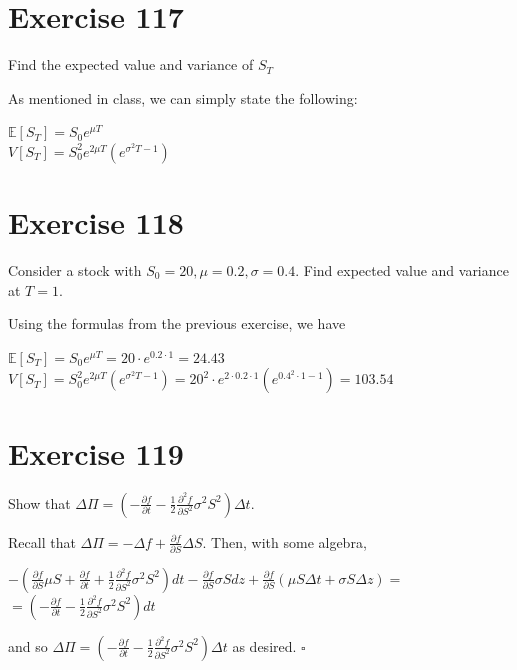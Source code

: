 \documentclass{article}
\begin{document}
\section*{Exercise 117}
Find the expected value and variance of $S_T$
\begin{flushleft}
    As mentioned in class, we can simply state the following:
    \begin{center}
        $\mathbb{E}[S_T] = S_0e^{\mu T}$ \\
        $V[S_T] = S_0^2 e^{2\mu T}(e^{\sigma^2T - 1})$
    \end{center}
\end{flushleft}

\section*{Exercise 118}
Consider a stock with $S_0 = 20, \mu = 0.2, \sigma = 0.4$. Find expected value and variance at $T=1$.
\begin{flushleft}
    Using the formulas from the previous exercise, we have
    \begin{center}
        $\mathbb{E}[S_T] = S_0e^{\mu T} = 20 \cdot e^{0.2 \cdot 1} = 24.43$ \\
        $V[S_T] = S_0^2 e^{2\mu T}(e^{\sigma^2T - 1}) = 20^2 \cdot e^{2 \cdot 0.2 \cdot 1}(e^{0.4^2 \cdot 1 - 1}) = 103.54$
    \end{center}
\end{flushleft}

\section*{Exercise 119}
Show that $\Delta \Pi = \left( -\frac{\partial f}{\partial t} - \frac{1}{2}\frac{\partial ^2 f}{\partial S^2} \sigma^2 S^2 \right) \Delta t$.
\begin{flushleft}
    Recall that $\Delta \Pi = -\Delta f + \frac{\partial f}{\partial S} \Delta S$. Then, with some algebra,
    \begin{center}
        $-\left( \frac{\partial f}{\partial S}\mu S + \frac{\partial f}{\partial t} + \frac{1}{2} \frac{\partial^2f}{\partial S^2}\sigma^2S^2 \right)dt - \frac{\partial f}{\partial S}\sigma S dz + \frac{\partial f}{\partial S}\left( \mu S \Delta t + \sigma S \Delta z \right) = $ \\
        $ = \left( -\frac{\partial f}{\partial t} - \frac{1}{2}\frac{\partial^2f}{\partial S^2}\sigma^2 S^2 \right)dt$
    \end{center}
    and so $\Delta \Pi = \left( -\frac{\partial f}{\partial t} - \frac{1}{2}\frac{\partial ^2 f}{\partial S^2} \sigma^2 S^2 \right) \Delta t$ as desired. $\square$
\end{flushleft}
\end{document}
